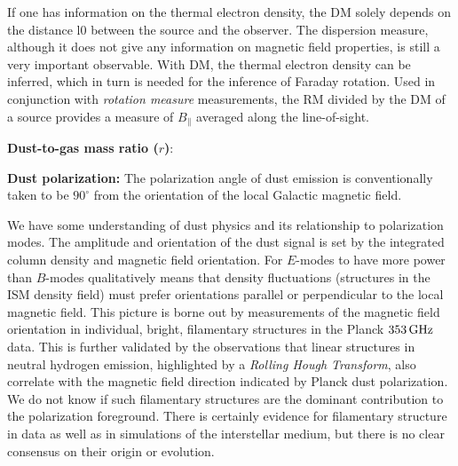 \documentclass[a4paper,10pt]{article}
\begin{document}
{\noindent}If one has information on the thermal electron density, the DM solely depends on the distance l0 between the source and the observer. The dispersion measure, although it does not give any information on magnetic field properties, is still a very important observable. With DM, the thermal electron density can be inferred, which in turn is needed for the inference of Faraday rotation. Used in conjunction with \textit{rotation measure} measurements, the RM divided by the DM of a source provides a measure of $B_\parallel$ averaged along the line-of-sight.

{\noindent}\textbf{Dust-to-gas mass ratio ($r$)}: 

{\noindent}\textbf{Dust polarization:} The polarization angle of dust emission is conventionally taken to be $90^\circ$ from the orientation of the local Galactic magnetic field.

{\noindent}We have some understanding of dust physics and its relationship to polarization modes. The amplitude and orientation of the dust signal is set by the integrated column density and magnetic field orientation. For $E$-modes to have more power than $B$-modes qualitatively means that density fluctuations (structures in the ISM density field) must prefer orientations parallel or perpendicular to the local magnetic field. This picture is borne out by measurements of the magnetic field orientation in individual, bright, filamentary structures in the Planck $353\,{\rm GHz}$ data. This is further validated by the observations that linear structures in neutral hydrogen emission, highlighted by a \textit{Rolling Hough Transform}, also correlate with the magnetic field direction indicated by Planck dust polarization. We do not know if such filamentary structures are the dominant contribution to the polarization foreground. There is certainly evidence for filamentary structure in data as well as in simulations of the interstellar medium, but there is no clear consensus on their origin or evolution.
\end{document}
